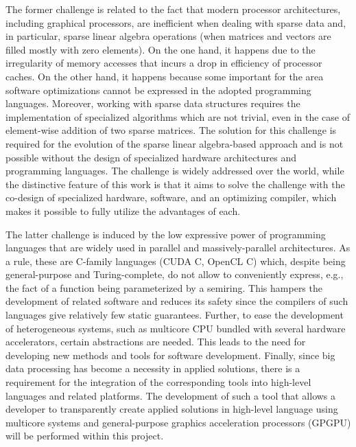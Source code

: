 \documentclass[12pt]{article}  %
\theoremstyle{remark}
\begin{document}
The former challenge is related to the fact that modern processor architectures, including graphical processors, are inefficient when dealing with sparse data and, in particular, sparse linear algebra operations (when matrices and vectors are filled mostly with zero elements). On the one hand, it happens due to the irregularity of memory accesses that incurs a drop in efficiency of processor caches. On the other hand, it happens because some important for the area software optimizations cannot be expressed in the adopted programming languages. Moreover, working with sparse data structures requires the implementation of specialized algorithms which are not trivial, even in the case of element-wise addition of two sparse matrices. The solution for this challenge is required for the evolution of the sparse linear algebra-based approach and is not possible without the design of specialized hardware architectures and programming languages. The challenge is widely addressed over the world, while the distinctive feature of this work is that it aims to solve the challenge with the co-design of specialized hardware, software, and an optimizing compiler, which makes it possible to fully utilize the advantages of each.

The latter challenge is induced by the low expressive power of programming languages that are widely used in parallel and massively-parallel architectures. As a rule, these are C-family languages (CUDA C, OpenCL C) which, despite being general-purpose and Turing-complete, do not allow to conveniently express, e.g., the fact of a function being parameterized by a semiring. This hampers the development of related software and reduces its safety since the compilers of such languages give relatively few static guarantees. Further, to ease the development of heterogeneous systems, such as multicore CPU bundled with several hardware accelerators, certain abstractions are needed. This leads to the need for developing new methods and tools for software development. Finally, since big data processing has become a necessity in applied solutions, there is a requirement for the integration of the corresponding tools into high-level languages and related platforms. The development of such a tool that allows a developer to transparently create applied solutions in high-level language using multicore systems and general-purpose graphics acceleration processors (GPGPU) will be performed within this project.
\end{document}
